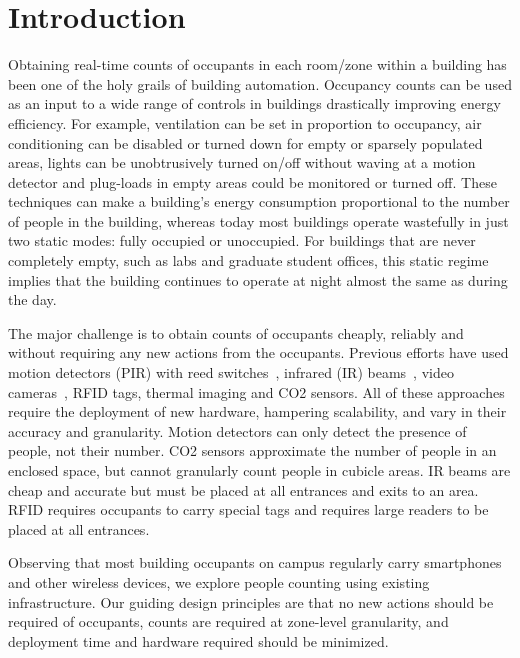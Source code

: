 \section{Introduction}

Obtaining real-time counts of occupants in each room/zone within a building has been one of the holy grails of building automation. Occupancy counts can be used as an input to a wide range of controls in buildings drastically improving energy efficiency. For example,  ventilation can be set in proportion to occupancy, air conditioning can be disabled or turned down for empty or sparsely populated areas, lights can be unobtrusively turned on/off without waving at a motion detector and plug-loads in empty areas could be monitored or turned off. These techniques can make a building's energy consumption proportional to the number of people in the building, whereas today most buildings operate wastefully in just two static modes: fully occupied or unoccupied. For buildings that are never completely empty, such as labs and graduate student offices, this static regime implies that the building continues to operate at night almost the same as during the day.

The major challenge is to obtain counts of occupants cheaply, reliably and without requiring any new actions from the occupants. Previous efforts have used motion detectors (PIR) with reed switches~\cite{Agarwal2010, Lu2010}, infrared (IR) beams~\cite{sun9}, video cameras~\cite{Erickson11}, RFID tags, thermal imaging and CO2 sensors. All of these approaches require the deployment of new hardware, hampering scalability, and vary in their accuracy and granularity. Motion detectors can only detect the presence of people, not their number. CO2 sensors approximate the number of people in an enclosed space, but cannot granularly count people in cubicle areas. IR beams are cheap and accurate but must be placed at all entrances and exits to an area. RFID requires occupants to carry special tags and requires large readers to be placed at all entrances. 

Observing that most building occupants on campus regularly carry smartphones and other wireless devices, we explore people counting using existing infrastructure. Our guiding design principles are that no new actions should be required of occupants, counts are required at zone-level granularity, and deployment time and hardware required should be minimized.

